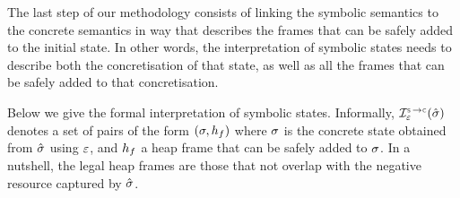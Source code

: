 The last step of our methodology consists of  linking the symbolic semantics to the concrete semantics
in way that describes the frames that can be safely added to the initial state.  
In other words, the interpretation of symbolic states needs to describe both the concretisation of that 
state, as well as all the frames that can be safely added to that concretisation. 

Below we give the formal interpretation of symbolic states. Informally, 
$\interpret{\symbconc}{\senv}(\sstate)$ denotes a set of pairs of the form $(\sigma, h_f)$
where $\sigma$ is the concrete state obtained from $\hat{\sigma}$ using $\varepsilon$, and $h_f$ 
a heap frame that can be safely added to $\sigma$. In a nutshell, the legal heap frames 
are those that not overlap with the negative resource captured by $\hat{\sigma}$. 

